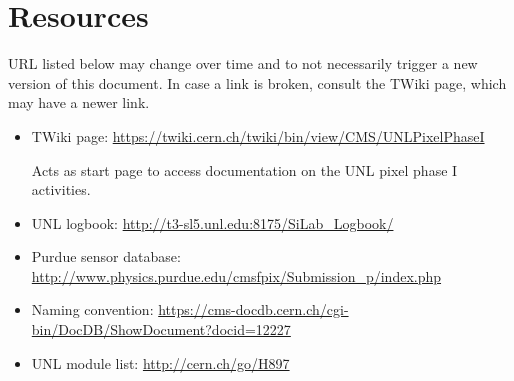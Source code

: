 \documentclass[12pt]{unlsilabsop}
\begin{document}
\section{Resources} \label{sec:resources}
URL listed below may change over time and to not necessarily trigger a new version of this document. In case a link is broken, consult the TWiki page, which may have a newer link.
\begin{itemize}
    \item TWiki page: \url{https://twiki.cern.ch/twiki/bin/view/CMS/UNLPixelPhaseI}

    Acts as start page to access documentation on the UNL pixel phase I activities.
    \item UNL logbook: \url{http://t3-sl5.unl.edu:8175/SiLab_Logbook/}
    \item Purdue sensor database: \url{http://www.physics.purdue.edu/cmsfpix/Submission_p/index.php}
    \item Naming convention: \url{https://cms-docdb.cern.ch/cgi-bin/DocDB/ShowDocument?docid=12227}
    \item UNL module list: \url{http://cern.ch/go/H897}
\end{itemize}
\end{document}
